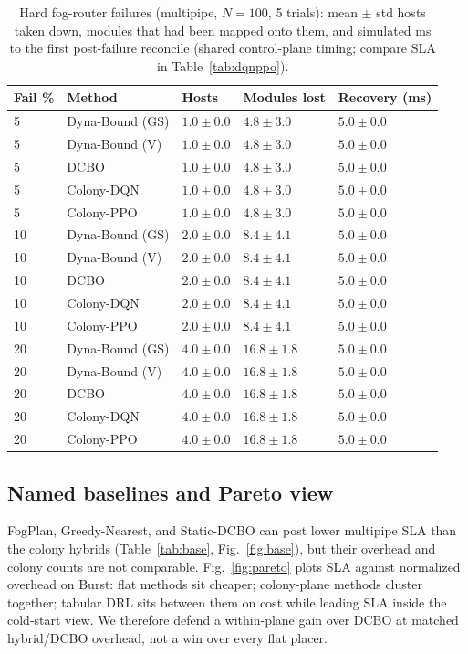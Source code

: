 \documentclass[11pt,a4paper]{article}
\begin{document}
\begin{table}[htbp]
\centering
\caption{Hard fog-router failures (multipipe, $N{=}100$, 5 trials): mean $\pm$ std
hosts taken down, modules that had been mapped onto them, and simulated ms to
the first post-failure reconcile (shared control-plane timing; compare SLA in
Table~\ref{tab:dqnppo}).}
\label{tab:fail}
\small
\begin{tabular}{@{}lllll@{}}
\toprule
Fail \% & Method & Hosts & Modules lost & Recovery (ms) \\
\midrule
5 & Dyna-Bound (GS) & $1.0{\pm}0.0$ & $4.8{\pm}3.0$ & $5.0{\pm}0.0$ \\
5 & Dyna-Bound (V) & $1.0{\pm}0.0$ & $4.8{\pm}3.0$ & $5.0{\pm}0.0$ \\
5 & DCBO & $1.0{\pm}0.0$ & $4.8{\pm}3.0$ & $5.0{\pm}0.0$ \\
5 & Colony-DQN & $1.0{\pm}0.0$ & $4.8{\pm}3.0$ & $5.0{\pm}0.0$ \\
5 & Colony-PPO & $1.0{\pm}0.0$ & $4.8{\pm}3.0$ & $5.0{\pm}0.0$ \\
10 & Dyna-Bound (GS) & $2.0{\pm}0.0$ & $8.4{\pm}4.1$ & $5.0{\pm}0.0$ \\
10 & Dyna-Bound (V) & $2.0{\pm}0.0$ & $8.4{\pm}4.1$ & $5.0{\pm}0.0$ \\
10 & DCBO & $2.0{\pm}0.0$ & $8.4{\pm}4.1$ & $5.0{\pm}0.0$ \\
10 & Colony-DQN & $2.0{\pm}0.0$ & $8.4{\pm}4.1$ & $5.0{\pm}0.0$ \\
10 & Colony-PPO & $2.0{\pm}0.0$ & $8.4{\pm}4.1$ & $5.0{\pm}0.0$ \\
20 & Dyna-Bound (GS) & $4.0{\pm}0.0$ & $16.8{\pm}1.8$ & $5.0{\pm}0.0$ \\
20 & Dyna-Bound (V) & $4.0{\pm}0.0$ & $16.8{\pm}1.8$ & $5.0{\pm}0.0$ \\
20 & DCBO & $4.0{\pm}0.0$ & $16.8{\pm}1.8$ & $5.0{\pm}0.0$ \\
20 & Colony-DQN & $4.0{\pm}0.0$ & $16.8{\pm}1.8$ & $5.0{\pm}0.0$ \\
20 & Colony-PPO & $4.0{\pm}0.0$ & $16.8{\pm}1.8$ & $5.0{\pm}0.0$ \\
\bottomrule
\end{tabular}
\end{table}

\subsection{Named baselines and Pareto view}
FogPlan, Greedy-Nearest, and Static-DCBO can post lower multipipe SLA than the
colony hybrids (Table~\ref{tab:base}, Fig.~\ref{fig:base}), but their overhead
and colony counts are not comparable. Fig.~\ref{fig:pareto} plots SLA against
normalized overhead on Burst: flat methods sit cheaper; colony-plane methods
cluster together; tabular DRL sits between them on cost while leading SLA inside
the cold-start view. We therefore defend a within-plane gain over DCBO at matched
hybrid/DCBO overhead, not a win over every flat placer.
\end{document}
